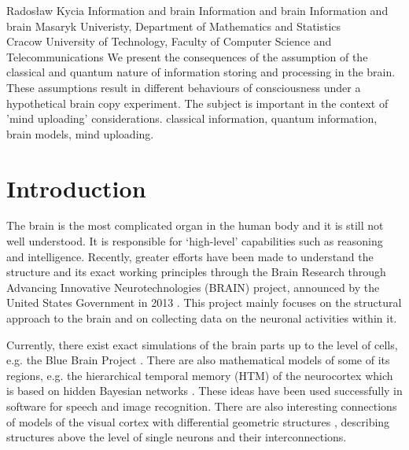 \begin{artengenv}{Radosław Kycia}
	{Information and brain}
	{Information and brain}
	{Information and brain}
	{Masaryk Univeristy, Department of Mathematics and Statistics\\
	Cracow University of Technology, Faculty of Computer Science and Telecommunications\label{kycia_anfang}}
	{We present the consequences of the assumption of the classical and quantum nature of information storing and processing in the brain. These assumptions result in different behaviours of consciousness under a hypothetical brain copy experiment. The subject is important in the context of 'mind uploading' considerations.}
	{classical information, quantum information, brain models, mind uploading.}
	
	


\section{Introduction}
\lettrine[loversize=0.13,lines=2,lraise=-0.03,nindent=0em,findent=0.2pt]%
{T}{}he brain is the most complicated organ in the human body and it is still not well understood. It is responsible for `high-level' capabilities such as reasoning and intelligence. Recently, greater efforts have been made to understand the structure and its exact working principles through the Brain Research through Advancing Innovative Neurotechnologies (BRAIN) project, announced by the United States Government in 2013 \parencite{BRAINInitiative}. This project mainly focuses on the structural approach to the brain and on collecting data on the neuronal activities within it.

Currently, there exist exact simulations of the brain parts up to the level of cells, e.g. the Blue Brain Project \parencite{BlueBrainProject}. There are also mathematical models of some of its regions, e.g. the hierarchical temporal memory (HTM) of the neurocortex \parencite{CortexModel1, CortexModel2} which is based on hidden Bayesian networks \parencite{KurzweilHowToCreateBrain}. These ideas have been used successfully in software for speech and image recognition. There are also interesting connections of models of the visual cortex with differential geometric structures \parencite{VisualCortex}, describing structures above the level of single neurons and their interconnections.


\end{artengenv}
